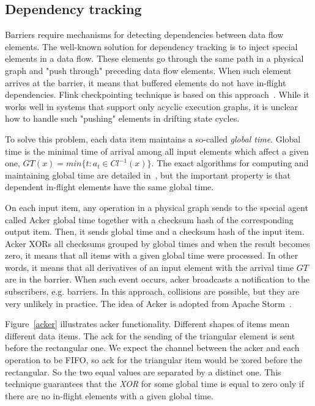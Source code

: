 \subsection{Dependency tracking}

Barriers require mechanisms for detecting dependencies between data flow elements. The well-known solution for dependency tracking is to inject special elements in a data flow. These elements go through the same path in a physical graph and "push through" preceding data flow elements. When such element arrives at the barrier, it means that buffered elements do not have in-flight dependencies. Flink checkpointing technique is based on this approach~\cite{Carbone:2017:SMA:3137765.3137777}. While it works well in systems that support only acyclic execution graphs, it is unclear how to handle such "pushing" elements in drifting state cycles. 

To solve this problem, each data item maintains a so-called {\em global time}. Global time is the minimal time of arrival among all input elements which affect a given one,  $GT(x)=min\{t:a_t\in Cl^{-1}(x)\}$. The exact algorithms for computing and maintaining global time are detailed in~\cite{we2018adbis}, but the important property is that dependent in-flight elements have the same global time. 

On each input item, any operation in a physical graph sends to the special agent called Acker global time together with a checksum hash of the corresponding output item. Then, it sends global time and a checksum hash of the input item. Acker XORs all checksums grouped by global times and when the result becomes zero, it means that all items with a given global time were processed. In other words, it means that all derivatives of an input element with the arrival time $GT$ are in the barrier. When such event occurs, acker broadcasts a notification to the subscribers, e.g. barriers. In this approach, collisions are possible, but they are very unlikely in practice. The idea of Acker is adopted from Apache Storm~\cite{apache:storm}.

Figure~\ref{acker} illustrates acker functionality. Different shapes of items mean different data items. The ack for the sending of the triangular element is sent before the rectangular one. We expect the channel between the acker and each operation to be FIFO, so ack for the triangular item would be xored before the rectangular. So the two equal values are separated by a distinct one. This technique guarantees that the {\it XOR} for some global time is equal to zero only if there are no in-flight elements with a given global time.

